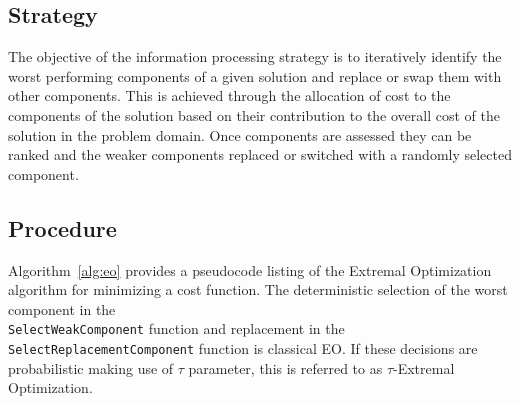 \subsection{Strategy}
The objective of the information processing strategy is to iteratively identify the worst performing components of a given solution and replace or swap them with other components.
This is achieved through the allocation of cost to the components of the solution based on their contribution to the overall cost of the solution in the problem domain. Once components are assessed they can be ranked and the weaker components replaced or switched with a randomly selected component.

\subsection{Procedure}
Algorithm~\ref{alg:eo} provides a pseudocode listing of the Extremal Optimization algorithm for minimizing a cost function. The deterministic selection of the worst component in the \\ \texttt{SelectWeakComponent} function and replacement in the \texttt{SelectReplacementComponent} function is classical EO. If these decisions are probabilistic making use of $\tau$ parameter, this is referred to as $\tau$-Extremal Optimization.

